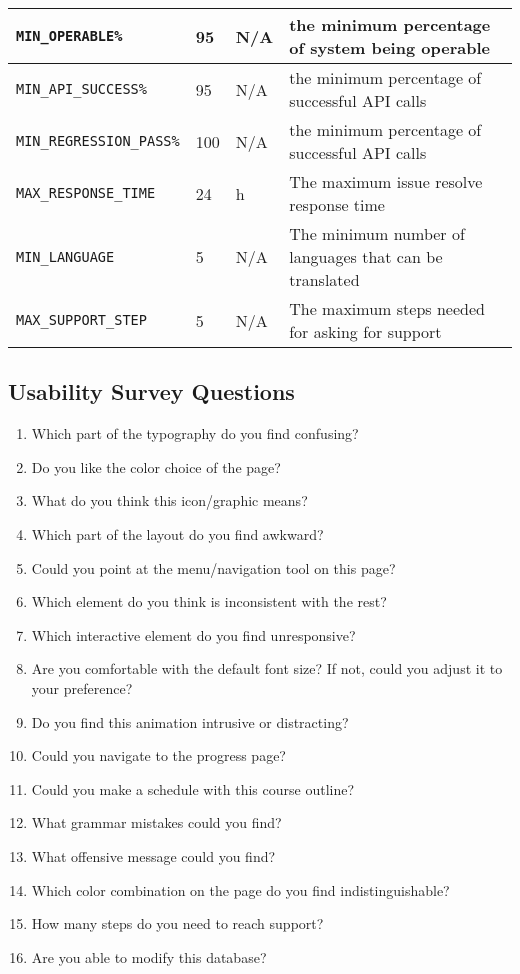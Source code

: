 \documentclass[12pt, titlepage]{article}
\begin{document}
\begin{longtable}{|l|l|l|p{5cm}|}
\hline
\texttt{MIN\_OPERABLE\%}\label{MIN_OPERABLE} & 95 & N/A & the minimum percentage of system being operable \\
\hline
\texttt{MIN\_API\_SUCCESS\%}\label{MIN_API_SUCCESS} & 95 & N/A &  the minimum percentage of successful API calls\\
\hline
\texttt{MIN\_REGRESSION\_PASS\%}\label{MIN_REGRESSION_PASS} & 100  & N/A &  the minimum percentage of successful API calls\\
\hline
\texttt{MAX\_RESPONSE\_TIME}\label{MAX_RESPONSE_TIME} & 24 & h & The maximum issue resolve response time\\
\hline
\texttt{MIN\_LANGUAGE}\label{MIN_LANGUAGE} & 5& N/A & The minimum number of languages that can be translated\\
\hline
\texttt{MAX\_SUPPORT\_STEP}\label{MAX_SUPPORT_STEP} & 5&N/A& The maximum steps needed for asking for support\\

\hline
\end{longtable}

\subsection{Usability Survey Questions}

\begin{enumerate}
  \item Which part of the typography do you find confusing?
  \item Do you like the color choice of the page?
  \item What do you think this icon/graphic means?
  \item Which part of the layout do you find awkward?
  \item Could you point at the menu/navigation tool on this page?
  \item Which element do you think is inconsistent with the rest?
  \item Which interactive element do you find unresponsive?
  \item Are you comfortable with the default font size? If not, could you adjust it to your preference?
  \item Do you find this animation intrusive or distracting?
  \item Could you navigate to the progress page?
  \item Could you make a schedule with this course outline?
  \item What grammar mistakes could you find?
  \item What offensive message could you find?
  \item Which color combination on the page do you find indistinguishable?
  \item How many steps do you need to reach support?
  \item Are you able to modify this database?
\end{enumerate}
\end{document}
